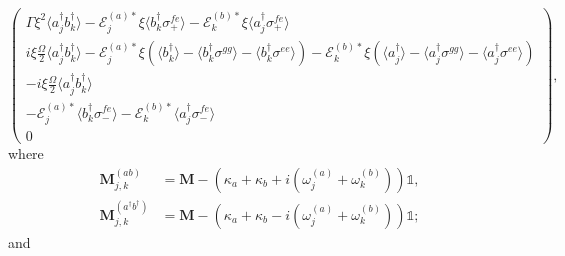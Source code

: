 \documentclass{article}
\begin{document}
\begin{subequations}
\begin{equation}
\begin{pmatrix}
			\Gamma \xi^{2} \langle a_{j}^{\dagger} b^{\dagger}_{k} \rangle - \mathcal{E}_{j}^{(a) *} \xi \langle b^{\dagger}_{k} \sigma^{fe}_{+} \rangle - \mathcal{E}_{k}^{(b) *} \xi \langle a^{\dagger}_{j} \sigma^{fe}_{+} \rangle \\
			i \xi \frac{\Omega}{2} \langle a_{j}^{\dagger} b^{\dagger}_{k} \rangle - \mathcal{E}_{j}^{(a) *} \xi \left( \langle b^{\dagger}_{k} \rangle - \langle b^{\dagger}_{k} \sigma^{gg} \rangle - \langle b^{\dagger}_{k} \sigma^{ee} \rangle \right) - \mathcal{E}_{k}^{(b) *} \xi \left( \langle a^{\dagger}_{j} \rangle - \langle a^{\dagger}_{j} \sigma^{gg} \rangle - \langle a^{\dagger}_{j} \sigma^{ee} \rangle \right) \\
			-i \xi \frac{\Omega}{2} \langle a_{j}^{\dagger} b^{\dagger}_{k} \rangle \\
			-\mathcal{E}_{j}^{(a) *} \langle b^{\dagger}_{k} \sigma^{fe}_{-} \rangle - \mathcal{E}_{k}^{(b) *} \langle a^{\dagger}_{j} \sigma^{fe}_{-} \rangle \\
			0
		\end{pmatrix},
	\end{equation}
\end{subequations}
where
\begin{subequations}
	\begin{align}
		\bm{M}_{j, k}^{(ab)} &= \bm{M} - \left( \kappa_{a} + \kappa_{b} + i \left( \omega_{j}^{(a)} + \omega_{k}^{(b)} \right) \right) \mathbb{1}, \\
		\bm{M}_{j, k}^{(a^{\dagger} b^{\dagger})} &= \bm{M} - \left( \kappa_{a} + \kappa_{b} - i \left( \omega_{j}^{(a)} + \omega_{k}^{(b)} \right) \right) \mathbb{1}; 
	\end{align}
\end{subequations}
and
\end{document}
